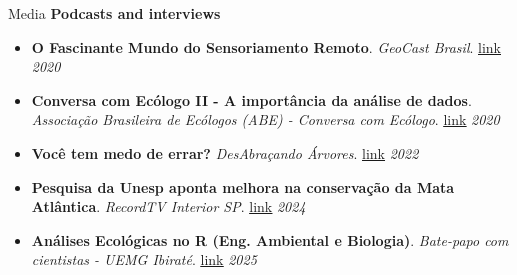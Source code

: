 \documentclass{resume}
\begin{document}
\begin{rSection}{Media}
{\bf Podcasts and interviews}
\begin{itemize} 
\item {\bf O Fascinante Mundo do Sensoriamento Remoto}. {\it GeoCast Brasil}. \href{https://open.spotify.com/episode/0Kn5k9039vM8bZgb4YdlJJ?si=S5hfhNc6S6GfDFaJSsaQDA}{\underline{link}} \hfill{\em 2020}
\item {\bf Conversa com Ecólogo II - A importância da análise de dados}. {\it Associação Brasileira de Ecólogos (ABE) - Conversa com Ecólogo}. \href{https://www.instagram.com/p/CFQVjMtH6qk/}{\underline{link}} \hfill{\em 2020}
\item {\bf Você tem medo de errar?} {\it DesAbraçando Árvores}. \href{https://www.desabrace.com.br/092-voce-tem-medo-de-errar/}{\underline{link}} \hfill{\em 2022} 
\item {\bf Pesquisa da Unesp aponta melhora na conservação da Mata Atlântica}. {\it RecordTV Interior SP}. \href{https://recordtv.r7.com/recordtv-interior-sp/sp-record/pesquisa-da-unesp-aponta-melhora-na-conservacao-da-mata-atlantica-27032024?utm_source=link_direto&utm_medium=share-bar&utm_campaign=r7-topo}{\underline{link}} \hfill{\em 2024}
\item {\bf Análises Ecológicas no R (Eng. Ambiental e Biologia)}. {\it Bate-papo com cientistas - UEMG Ibiraté}. \href{https://open.spotify.com/episode/4LiZ1WDiwKngynSlnXsrZI?si=fNc4zFZxQNC2Bp1RQqNgqw&nd=1&dlsi=497a0d5ac54b4257}{\underline{link}} \hfill{\em 2025}
\end{itemize} 
\end{rSection}

\end{document}
